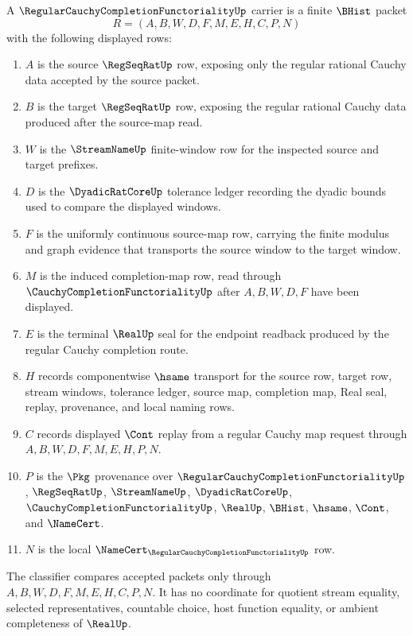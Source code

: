 \begin{definition}
\label{def:regular-cauchy-completion-functoriality-carrier}
A $\RegularCauchyCompletionFunctorialityUp$ carrier is a finite $\BHist$ packet
$$
R=(A,B,W,D,F,M,E,H,C,P,N)
$$
with the following displayed rows:
\begin{enumerate}
\item $A$ is the source $\RegSeqRatUp$ row, exposing only the regular rational Cauchy data accepted by the source packet.
\item $B$ is the target $\RegSeqRatUp$ row, exposing the regular rational Cauchy data produced after the source-map read.
\item $W$ is the $\StreamNameUp$ finite-window row for the inspected source and target prefixes.
\item $D$ is the $\DyadicRatCoreUp$ tolerance ledger recording the dyadic bounds used to compare the displayed windows.
\item $F$ is the uniformly continuous source-map row, carrying the finite modulus and graph evidence that transports the source window to the target window.
\item $M$ is the induced completion-map row, read through $\CauchyCompletionFunctorialityUp$ after $A,B,W,D,F$ have been displayed.
\item $E$ is the terminal $\RealUp$ seal for the endpoint readback produced by the regular Cauchy completion route.
\item $H$ records componentwise $\hsame$ transport for the source row, target row, stream windows, tolerance ledger, source map, completion map, Real seal, replay, provenance, and local naming rows.
\item $C$ records displayed $\Cont$ replay from a regular Cauchy map request through $A,B,W,D,F,M,E,H,P,N$.
\item $P$ is the $\Pkg$ provenance over $\RegularCauchyCompletionFunctorialityUp$, $\RegSeqRatUp$, $\StreamNameUp$, $\DyadicRatCoreUp$, $\CauchyCompletionFunctorialityUp$, $\RealUp$, $\BHist$, $\hsame$, $\Cont$, and $\NameCert$.
\item $N$ is the local $\NameCert_{\RegularCauchyCompletionFunctorialityUp}$ row.
\end{enumerate}
The classifier compares accepted packets only through $A,B,W,D,F,M,E,H,C,P,N$. It has no coordinate for quotient stream equality, selected representatives, countable choice, host function equality, or ambient completeness of $\RealUp$.
\end{definition}

